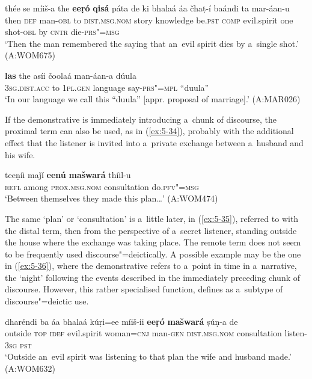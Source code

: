 \begin{exe}
\ex
\label{ex:5-32}
\gll thée se míiš-a the \textbf{eeṛó} \textbf{qisá} páta de ki bhalaá áa čhaṭ-í baándi ta mar-áan-u\\
then \textsc{def} man-\textsc{obl} to \textsc{dist.msg.nom} story knowledge be.\textsc{pst} \textsc{comp} evil.spirit one shot-\textsc{obl} by \textsc{cntr} die-\textsc{prs"=msg}\\
\glt `Then the man remembered the saying that an~evil spirit dies by a~single shot.' (A:WOM675)
\end{exe}
\begin{exe}
\ex
\label{ex:5-33}
\gll \textbf{las} the asíi čoolaá man-áan-a dúula\\
\textsc{3sg}.\textsc{dist.acc} to \textsc{1pl.gen} language say-\textsc{prs"=mpl} ``duula''\\
\glt `In our language we call this ``duula'' [appr. proposal of marriage].' (A:MAR026)
\end{exe}
If the demonstrative is immediately introducing a~chunk of discourse, the proximal term can also be used, as in (\ref{ex:5-34}), probably with the additional effect that the listener is invited into a~private exchange between a~husband and his wife. 

\begin{exe}
\ex
\label{ex:5-34}
\gll teeṇíi maǰí \textbf{eenú} \textbf{mašwará} thíil-u \\
\textsc{refl} among \textsc{prox.msg.nom} consultation do.\textsc{pfv"=msg}\\
\glt `Between themselves they made this plan{\ldots}' (A:WOM474)
\end{exe}

The same `plan' or `consultation' is a~little later, in (\ref{ex:5-35}), referred to with the distal term, then from the perspective of a~secret listener, standing outside the house where the exchange was taking place. The remote term does not seem to be frequently used discourse"=deictically. A possible example may be the one in (\ref{ex:5-36}), where the demonstrative refers to a~point in time in a~narrative, the `night' following the events described in the immediately preceding chunk of discourse. However, this rather specialised function, \citet[225]{himmelmann1996} defines as a~subtype of discourse"=deictic use.

\begin{exe}
\ex
\label{ex:5-35}
\gll dharéndi ba áa bhalaá kúṛi=ee míiš-ii \textbf{eeṛó} \textbf{mašwará} ṣúṇ-a de \\
outside \textsc{top} \textsc{idef} evil.spirit woman=\textsc{cnj} man-\textsc{gen} \textsc{dist.msg.nom} consultation listen-\textsc{3sg} \textsc{pst} \\
\glt `Outside an~evil spirit was listening to that plan the wife and husband made.' (A:WOM632)
\end{exe}

